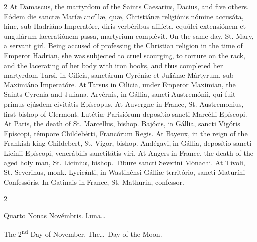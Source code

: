 \begin{paracol}{2}
\switchcolumn
{}
At Damascus, the martyrdom of the 
 Saints Caesarius, Dacius, and five others.
\switchcolumn*
{}
Eódem die sanctæ Maríæ 
 ancíllæ, quæ, Christiánæ religiónis nómine accusáta, hinc, sub Hadriáno 
 Imperatóre, diris verbéribus afflícta, equúlei extensiónem et ungulárum 
 laceratiónem passa, martyrium complévit.
\switchcolumn
{}
On the same day, St. Mary, a servant girl. Being 
 accused of professing the Christian religion in the time of Emperor Hadrian, 
 she was subjected to cruel scourging, to torture on the rack, and the 
 lacerating of her body with iron hooks, and thus completed her martyrdom
\switchcolumn*
{}
Tarsi, in Cilícia, sanctárum Cyréniæ et Juliánæ Mártyrum, sub Maximiáno Imperatóre.
\switchcolumn
{}
At Tarsus in Cilicia, under Emperor 
 Maximian, the Saints Cyrenia and Juliana.
\switchcolumn*
{}
Arvérnis, in Gállia, 
 sancti Austremónii, qui fuit primus ejúsdem civitátis Epíscopus.
\switchcolumn
{}
At Auvergne in France, St. 
 Austremonius, first bishop of Clermont.
\switchcolumn*
{}
Lutétiæ Parisiórum 
 deposítio sancti Marcélli Epíscopi.
\switchcolumn
{}
At Paris, the death of St. 
 Marcellus, bishop.
\switchcolumn*
{}
Bajócis, in Gállia, 
 sancti Vigóris Epíscopi, témpore Childebérti, Francórum Regis.
\switchcolumn
{}
At Bayeux, in the reign of the 
 Frankish king Childebert, St. Vigor, bishop.
\switchcolumn*
{}
Andégavi, in Gállia, 
 deposítio sancti Licínii Epíscopi, venerábilis sanctitátis viri.
\switchcolumn
{}
At Angers in France, the death of 
 the aged holy man, St. Licinius, bishop.
\switchcolumn*
{}
Tíbure sancti Severíni 
 Mónachi.
\switchcolumn
{}
At Tivoli, St. Severinus, monk.
\switchcolumn*
{}
Lyricánti, in 
 Wastinénsi Gálliæ território, sancti Maturíni Confessóris.
\switchcolumn
{}
In Gatinais in France, St. Mathurin, 
 confessor.
\switchcolumn*
{}
\end{paracol}


\begin{paracol}{2}
\begin{center}{\color{gregoriocolor} Quarto Nonas Novémbris. 
 Luna\dots\ }\end{center}
\switchcolumn
{}
\begin{center}{\color{gregoriocolor} The 2\textsuperscript{nd} Day of 
 November. The\dots\ Day of the Moon.}\end{center}
\end{paracol}

